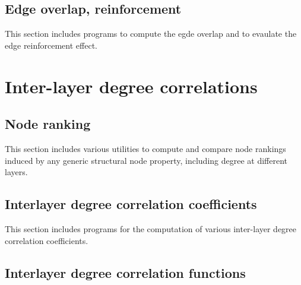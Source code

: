 \documentclass[a4paper,11pt]{book}
\begin{document}





\subsection{Edge overlap, reinforcement}
This section includes programs to compute the egde overlap and to
evaulate the edge reinforcement effect. 





\section{Inter-layer degree correlations}

\subsection{Node ranking}

This section includes various utilities to compute and compare node
rankings induced by any generic structural node property, including
degree at different layers.





\subsection{Interlayer degree correlation coefficients}

This section includes programs for the computation of various
inter-layer degree correlation coefficients.






\subsection{Interlayer degree correlation functions}
\end{document}
